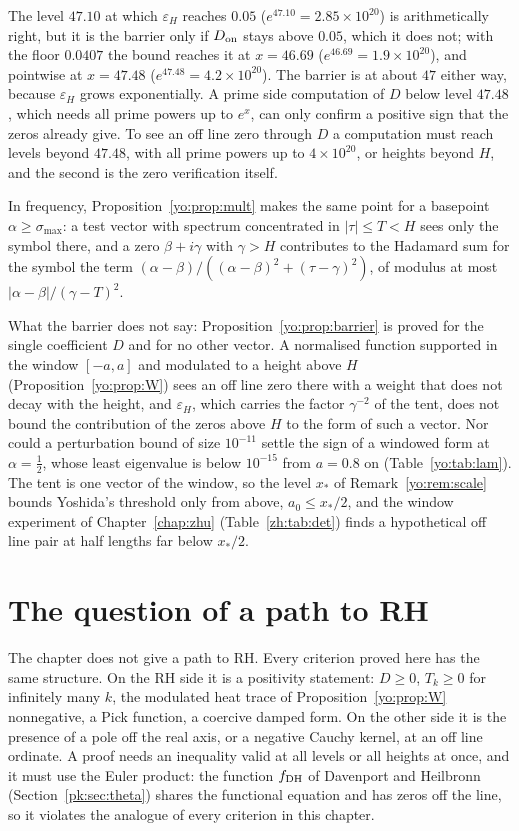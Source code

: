 The level $47.10$ at which $\varepsilon_H$ reaches $0.05$ ($e^{47.10}=2.85\times10^{20}$) is arithmetically right, but it is the barrier only if $D_{\rm on}$ stays above $0.05$, which it does not; with the floor $0.0407$ the bound reaches it at $x=46.69$ ($e^{46.69}=1.9\times10^{20}$), and pointwise at $x=47.48$ ($e^{47.48}=4.2\times10^{20}$). The barrier is at about $47$ either way, because $\varepsilon_H$ grows exponentially. A prime side computation of $D$ below level $47.48$, which needs all prime powers up to $e^x$, can only confirm a positive sign that the zeros already give. To see an off line zero through $D$ a computation must reach levels beyond $47.48$, with all prime powers up to $4\times10^{20}$, or heights beyond $H$, and the second is the zero verification itself.

In frequency, Proposition~\ref{yo:prop:mult} makes the same point for a basepoint $\alpha\ge\sigma_{\max}$: a test vector with spectrum concentrated in $|\tau|\le T<H$ sees only the symbol there, and a zero $\beta+i\gamma$ with $\gamma>H$ contributes to the Hadamard sum for the symbol the term $(\alpha-\beta)/((\alpha-\beta)^2+(\tau-\gamma)^2)$, of modulus at most $|\alpha-\beta|/(\gamma-T)^2$.

What the barrier does not say: Proposition~\ref{yo:prop:barrier} is proved for the single coefficient $D$ and for no other vector. A normalised function supported in the window $[-a,a]$ and modulated to a height above $H$ (Proposition~\ref{yo:prop:W}) sees an off line zero there with a weight that does not decay with the height, and $\varepsilon_H$, which carries the factor $\gamma^{-2}$ of the tent, does not bound the contribution of the zeros above $H$ to the form of such a vector. Nor could a perturbation bound of size $10^{-11}$ settle the sign of a windowed form at $\alpha=\frac12$, whose least eigenvalue is below $10^{-15}$ from $a=0.8$ on (Table~\ref{yo:tab:lam}). The tent is one vector of the window, so the level $x_*$ of Remark~\ref{yo:rem:scale} bounds Yoshida's threshold only from above, $a_0\le x_*/2$, and the window experiment of Chapter~\ref{chap:zhu} (Table~\ref{zh:tab:det}) finds a hypothetical off line pair at half lengths far below $x_*/2$.

\section{The question of a path to RH}\label{yo:sec:path}\label{wt:sec:path}

The chapter does not give a path to RH. Every criterion proved here has the same structure. On the RH side it is a positivity statement: $D\ge0$, $T_k\ge0$ for infinitely many $k$, the modulated heat trace of Proposition~\ref{yo:prop:W} nonnegative, a Pick function, a coercive damped form. On the other side it is the presence of a pole off the real axis, or a negative Cauchy kernel, at an off line ordinate. A proof needs an inequality valid at all levels or all heights at once, and it must use the Euler product: the function $f_{\rm DH}$ of Davenport and Heilbronn \cite{DH36} (Section~\ref{pk:sec:theta}) shares the functional equation and has zeros off the line, so it violates the analogue of every criterion in this chapter.

